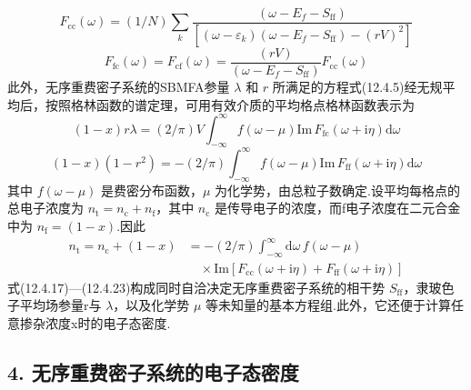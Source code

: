 \begin{equation}
  F_{\mathrm{cc}}\left(\omega\right)=\left(1/N\right)\sum_{k}
  \frac{\left(\omega-E_{f}-S_{\mathrm{ff}}\right)}
  {\left[\left(\omega-\varepsilon_{k}\right)\left(\omega-E_{f}-S_{\mathrm{ff}}\right)-\left(rV\right)^{2}\right]}
\end{equation}
\begin{equation}
  F_{\mathrm{fc}}\left(\omega\right)=F_{\mathrm{cf}}\left(\omega\right)
  =\frac{\left(rV\right)}{\left(\omega-E_{f}-S_{\mathrm{ff}}\right)}F_{\mathrm{cc}}\left(\omega\right)
\end{equation}
此外，无序重费密子系统的SBMFA参量 $\lambda$ 和 $r$ 所满足的方程式(12.4.5)经无规平均后，按照格林函数的谱定理，可用有效介质的平均格点格林函数表示为
\begin{equation}
  \left(1-x\right)r\lambda=\left(2/\pi\right)V\int_{-\infty}^{\infty}
  f\left(\omega-\mu\right)\mathrm{Im}\,F_{\mathrm{fc}}\left(\omega+\mathrm{i}\eta\right)\mathrm{d}\omega
\end{equation}
\begin{equation}
  \left(1-x\right)\left(1-r^{2}\right)=-\left(2/\pi\right)\int_{-\infty}^{\infty}
  f\left(\omega-\mu\right)\mathrm{Im}\,F_{\mathrm{ff}}\left(\omega+\mathrm{i}\eta\right)\mathrm{d}\omega
\end{equation}
其中 $f\left(\omega-\mu\right)$ 是费密分布函数，$\mu$ 为化学势，由总粒子数确定.设平均每格点的总电子浓度为 $n_{\mathrm{t}}=n_{\mathrm{c}}+n_{\mathrm{f}}$，其中 $n_{\mathrm{c}}$ 是传导电子的浓度，而f电子浓度在二元合金中为 $n_{\mathrm{f}}=\left(1-x\right)$.因此
\begin{equation}
\begin{aligned}
  n_{\mathrm{t}}=n_{\mathrm{c}}+\left(1-x\right)
  &=-\left(2/\pi\right)\int_{-\infty}^{\infty}\mathrm{d}\omega\,f\left(\omega-\mu\right)\\
  &\quad\times\mathrm{Im}\left[F_{\mathrm{cc}}\left(\omega+\mathrm{i}\eta\right)
  +F_{\mathrm{ff}}\left(\omega+\mathrm{i}\eta\right)\right]
\end{aligned}
\end{equation}
式(12.4.17)—(12.4.23)构成同时自洽决定无序重费密子系统的相干势 $S_{\mathrm{ff}}$，隶玻色子平均场参量r与 $\lambda$，以及化学势 $\mu$ 等未知量的基本方程组.此外，它还便于计算任意掺杂浓度x时的电子态密度.

\subsection*{4. 无序重费密子系统的电子态密度}


